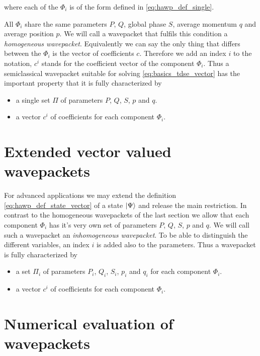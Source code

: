 where each of the $\Phi_i$ is of the form defined in \eqref{eq:hawp_def_single}.

All $\Phi_i$ share the same parameters $P$, $Q$, global phase $S$, average momentum
$q$ and average position $p$. We will call a wavepacket that fulfils this condition a \emph{homogeneous wavepacket}.
Equivalently we can say the only thing that differs between the $\Phi_i$ is the vector of coefficients $c$.
Therefore we add an index $i$ to the notation, $c^i$ stands for the coefficient vector of the component $\Phi_i$.
Thus a semiclassical wavepacket suitable for solving \eqref{eq:basics_tdse_vector}
has the important property that it is fully characterized by

\begin{itemize}
  \item a single set $\Pi$ of parameters $P$, $Q$, $S$, $p$ and $q$.
  \item a vector $c^i$ of coefficients for each component $\Phi_i$.
\end{itemize}

\section{Extended vector valued wavepackets}

For advanced applications we may extend the definition \eqref{eq:hawp_def_state_vector}
of a state $\Ket{\Psi}$ and release the main restriction. In contrast to the homogeneous
wavepackets of the last section we allow that each component $\Phi_i$ has it's very
own set of parameters $P$, $Q$, $S$, $p$ and $q$. We will call such a wavepacket
an \emph{inhomogeneous wavepacket}. To be able to distinguish the different variables,
an index $i$ is added also to the parameters. Thus a wavepacket is fully characterized by

\begin{itemize}
  \item a set $\Pi_i$ of parameters $P_i$, $Q_i$, $S_i$, $p_i$ and $q_i$ for each component $\Phi_i$.
  \item a vector $c^i$ of coefficients for each component $\Phi_i$.
\end{itemize}

\section{Numerical evaluation of wavepackets}

